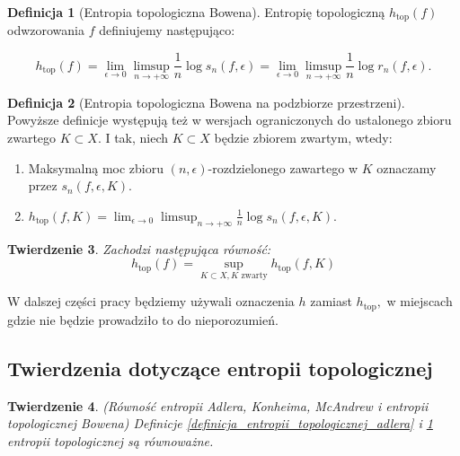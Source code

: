 \documentclass[licencjacka]{pwr_wmat_praca_dyplomowa}
\theoremstyle{plain}
\newtheorem{theorem}{Twierdzenie}
\numberwithin{theorem}{chapter}
\theoremstyle{definition}
\numberwithin{theorem}{chapter}
\newtheorem{definition}[theorem]{Definicja}
\begin{document}
\begin{definition}[Entropia topologiczna Bowena]
\label{definicja_entropii_topologicznej_bowena}
\cite[s.~59]{ruette2017chaos}
Entropię topologiczną $h_{\textrm{top}}(f)$ odwzorowania $f$ definiujemy następująco:

$$h_{\textrm{top}}(f) = \lim_{\epsilon \rightarrow 0} \limsup_{n \rightarrow +\infty} \frac{1}{n} \log s_n(f, \epsilon) = \lim_{\epsilon \rightarrow 0} \limsup_{n \rightarrow +\infty} \frac{1}{n} \log r_n(f, \epsilon).$$

\end{definition}


\begin{definition}[Entropia topologiczna Bowena na podzbiorze przestrzeni]
\label{entropia_bowena_podzbior_przestrzeni}
\cite[s.~402]{bowen1971entropy__do_dowodu_rownosci_topologicznej_entropii_2_twierdzenie17}
Powyższe definicje występują też w wersjach ograniczonych do ustalonego zbioru zwartego $K \subset X.$ I tak, niech $K \subset X$ będzie zbiorem zwartym, wtedy:
\begin{enumerate}
\item Maksymalną moc zbioru $(n, \epsilon)$-rozdzielonego zawartego w $K$ oznaczamy przez $s_n(f, \epsilon, K).$
\item $h_{\textrm{top}}(f, K) = \lim_{\epsilon \rightarrow 0} \limsup_{n \rightarrow +\infty} \frac{1}{n} \log s_n(f, \epsilon, K).$
\end{enumerate}

\end{definition}


\begin{theorem}
\cite[s.~402]{bowen1971entropy__do_dowodu_rownosci_topologicznej_entropii_2_twierdzenie17}
Zachodzi następująca równość:
$$h_{\textrm{top}}(f) = \sup_{K \subset X, K \textrm{ zwarty}}h_{\textrm{top}}(f, K)$$
\end{theorem}

W dalszej części pracy będziemy używali oznaczenia $h$ zamiast $h_{\textrm{top}},$ w miejscach gdzie nie będzie prowadziło to do nieporozumień.

\subsection{Twierdzenia dotyczące entropii topologicznej}

\begin{theorem}(Równość entropii Adlera, Konheima, McAndrew i entropii topologicznej Bowena)
Definicje \ref{definicja_entropii_topologicznej_adlera} i \ref{definicja_entropii_topologicznej_bowena} entropii topologicznej są równoważne.
\end{theorem}
\end{document}

